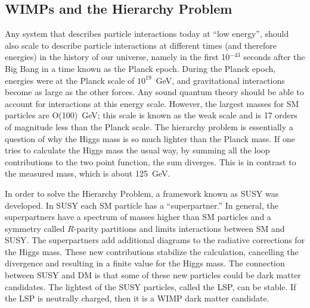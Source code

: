 \subsection{WIMPs and the Hierarchy Problem}
\label{sec:wimp_miracle}
Any system that describes particle interactions today at ``low energy'', should also scale to describe particle interactions at different times (and therefore energies) in the history of our universe, namely in the first 10$^{-43}$ seconds after the Big Bang in a time known as the Planck epoch. During the Planck epoch, energies were at the Planck scale of $10^{19}$~GeV, and gravitational interactions become as large as the other forces. Any sound quantum theory should be able to account for interactions at this energy scale. However, the largest masses for \ac{SM} particles are O(100)~GeV; this scale is known as the weak scale and is 17 orders of magnitude less than the Planck scale. The hierarchy problem is essentially a question of why the Higgs mass is so much lighter than the Planck mass. If one tries to calculate the Higgs mass the usual way, by summing all the loop contributions to the two point function, the sum diverges. This is in contrast to the measured mass, which is about 125~GeV. 


In order to solve the Hierarchy Problem, a framework known as \ac{SUSY} was developed. In \ac{SUSY} each \ac{SM} particle has a ``superpartner.'' In general, the superpartners have a spectrum of masses higher than \ac{SM} particles and a symmetry called $R$-parity partitions and limits interactions between \ac{SM} and \ac{SUSY}. The superpartners add additional diagrams to the radiative corrections for the Higgs mass. These new contributions stabilize the calculation, cancelling the divergence and resulting in a finite value for the Higgs mass. The connection between \ac{SUSY} and \ac{DM} is that some of these new particles could be dark matter candidates. The lightest of the \ac{SUSY} particles, called the \ac{LSP}, can be stable. If the \ac{LSP} is neutrally charged, then it is a \ac{WIMP} dark matter candidate.

